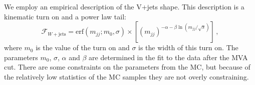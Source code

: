 We employ an empirical description of the V+jets shape.  This
description is a kinematic turn on and a power law tail:
\begin{equation}
  \mathcal{F}_{W+\text{jets}} = \text{erf}(m_{jj}; m_0, \sigma)\times\left[(m_{jj})^{-\alpha-\beta\ln(m_{jj}/\sqrt{s})}\right]\,,
\end{equation}
where $m_0$ is the value of the turn on and $\sigma$ is the width of
this turn on.  The parameters $m_0$, $\sigma$, $\alpha$ and $\beta$
are determined in the fit to the data after the MVA cut.  There are
some constraints on the parameters from the MC, but because of the
relatively low statistics of the MC samples they are not overly
constraining.





